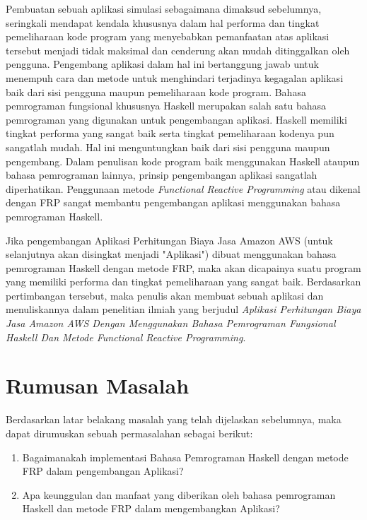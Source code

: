 \documentclass[pi.tex]{subfile}
\begin{document}
Pembuatan sebuah aplikasi simulasi sebagaimana dimaksud sebelumnya, seringkali mendapat kendala khususnya dalam hal performa dan tingkat pemeliharaan kode program yang menyebabkan pemanfaatan atas aplikasi tersebut menjadi tidak maksimal dan cenderung akan mudah ditinggalkan oleh pengguna. Pengembang aplikasi dalam hal ini bertanggung jawab untuk menempuh cara dan metode untuk menghindari terjadinya kegagalan aplikasi baik dari sisi pengguna maupun pemeliharaan kode program. Bahasa pemrograman fungsional khususnya Haskell merupakan salah satu bahasa pemrograman yang digunakan untuk pengembangan aplikasi. Haskell memiliki tingkat performa yang sangat baik serta tingkat pemeliharaan kodenya pun sangatlah mudah. Hal ini menguntungkan baik dari sisi pengguna maupun pengembang. Dalam penulisan kode program baik menggunakan Haskell ataupun bahasa pemrograman lainnya, prinsip pengembangan aplikasi sangatlah diperhatikan. Penggunaan metode \emph{Functional Reactive Programming} atau dikenal dengan FRP sangat membantu pengembangan aplikasi menggunakan bahasa pemrograman Haskell.

Jika pengembangan Aplikasi Perhitungan Biaya Jasa Amazon AWS (untuk selanjutnya akan disingkat menjadi "Aplikasi") dibuat menggunakan bahasa pemrograman Haskell dengan metode FRP, maka akan dicapainya suatu program yang memiliki performa dan tingkat pemeliharaan yang sangat baik. Berdasarkan pertimbangan tersebut, maka penulis akan membuat sebuah aplikasi dan menuliskannya dalam penelitian ilmiah yang berjudul \emph{Aplikasi Perhitungan Biaya Jasa Amazon AWS Dengan Menggunakan Bahasa Pemrograman Fungsional Haskell Dan Metode Functional Reactive Programming}.

\section{Rumusan Masalah}
Berdasarkan latar belakang masalah yang telah dijelaskan sebelumnya, maka dapat dirumuskan sebuah permasalahan sebagai berikut:
\begin{enumerate}[leftmargin=1.25cm]
  \item Bagaimanakah implementasi Bahasa Pemrograman Haskell dengan metode FRP dalam pengembangan Aplikasi?
  \item Apa keunggulan dan manfaat yang diberikan oleh bahasa pemrograman Haskell dan metode FRP dalam mengembangkan Aplikasi?
\end{enumerate}
\end{document}
